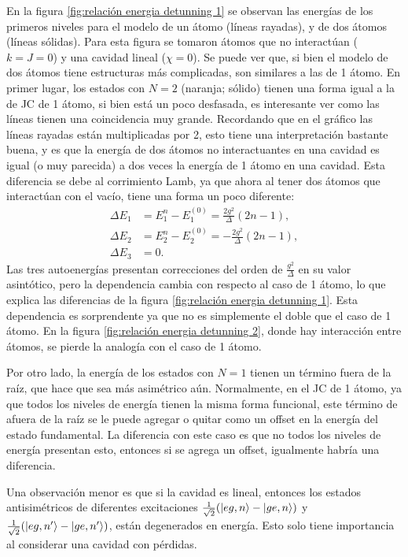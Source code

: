 En la figura \ref{fig:relación energia detunning 1} se observan las energías de los primeros niveles para el modelo de un átomo (líneas rayadas), y de dos átomos (líneas sólidas). Para esta figura se tomaron átomos que no interactúan ($k=J=0$) y una cavidad lineal ($\chi=0$). Se puede ver que, si bien el modelo de dos átomos tiene estructuras más complicadas, son similares a las de 1 átomo. En primer lugar, los estados con $N=2$ (naranja; sólido) tienen una forma igual a la de JC de 1 átomo, si bien está un poco desfasada, es interesante ver como las líneas tienen una coincidencia muy grande. Recordando que en el gráfico las líneas rayadas están multiplicadas por 2, esto tiene una interpretación bastante buena, y es que la energía de dos átomos no interactuantes en una cavidad es igual (o muy parecida) a dos veces la energía de 1 átomo en una cavidad. Esta diferencia se debe al corrimiento Lamb, ya que ahora al tener dos átomos que interactúan con el vacío, tiene una forma un poco diferente:
\begin{equation}
    \begin{aligned}
        \Delta E_{1}&=E^{n}_1-E^{(0)}_1=\frac{2g^2}{\Delta}(2n-1), \\
        \Delta E_{2}&=E^{n}_2-E^{(0)}_2=-\frac{2g^2}{\Delta}(2n-1), \\
        \Delta E_3 &=0 .
    \end{aligned}
\end{equation}
Las tres autoenergías presentan correcciones del orden de $\frac{g^2}{\Delta}$ en su valor asintótico, pero la dependencia cambia con respecto al caso de 1 átomo, lo que explica las diferencias de la figura \ref{fig:relación energia detunning 1}. Esta dependencia es sorprendente ya que no es simplemente el doble que el caso de 1 átomo. En la figura \ref{fig:relación energia detunning 2}, donde hay interacción entre átomos, se pierde la analogía con el caso de 1 átomo.

Por otro lado, la energ\'ia de los estados con $N=1$ tienen un t\'ermino fuera de la raíz, que hace que sea más asim\'etrico a\'un. Normalmente, en el JC de 1 átomo, ya que todos los niveles de energía tienen la misma forma funcional, este término de afuera de la raíz se le puede agregar o quitar como un offset en la energía del estado fundamental. La diferencia con este caso es que no todos los niveles de energía presentan esto, entonces si se agrega un offset, igualmente habría una diferencia. 

Una observación menor es que si la cavidad es lineal, entonces los estados antisimétricos de diferentes excitaciones $\frac{1}{\sqrt{2}}(\ket{eg,n}-\ket{ge,n})$ y $\frac{1}{\sqrt{2}}(\ket{eg,n'}-\ket{ge,n'})$, están degenerados en energía. Esto solo tiene importancia al considerar una cavidad con pérdidas.

